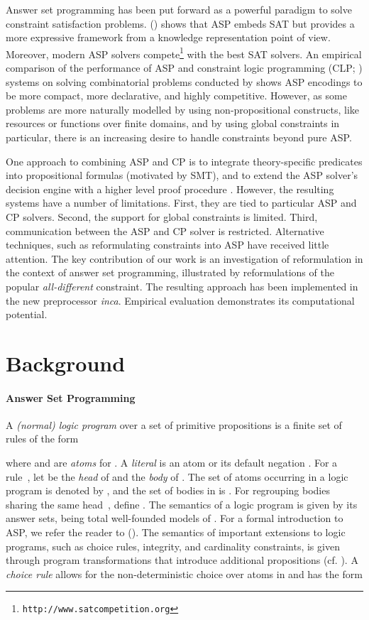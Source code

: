 \documentclass[letterpaper]{article}
\newcommand{\systemname}[1]{\textit{#1}}
\newcommand{\citeay}[1]{\citeauthor{#1} \citeyear{#1}}
\newcommand{\citeap}[1]{\citeauthor{#1} (\citeyear{#1})}
\begin{document}
Answer set programming has been put forward as a powerful paradigm to solve constraint  satisfaction problems. \citeap{niemela99a} shows that ASP embeds SAT but provides a more expressive framework from a knowledge representation point of view. Moreover, modern ASP solvers compete\footnote{\texttt{http://www.satcompetition.org}} with the best SAT solvers.
An empirical comparison of the performance of ASP and constraint logic programming (CLP; \citeay{jama94a}) systems on solving combinatorial problems conducted by \citeauthor{dofopo05a} shows ASP encodings to be more compact, more declarative, and highly competitive.
However, as some problems are more naturally modelled by using non-pro\-po\-si\-tional constructs, like resources or functions over finite domains, and by using global
constraints in particular, there is an increasing desire to handle constraints beyond pure ASP.

One approach to combining ASP and CP is to integrate theory-specific predicates into propositional formulas (motivated by SMT), and to extend the ASP solver's decision engine with a higher level proof procedure \cite{baboge05a,melgel08a,geossc09a}. However, the resulting systems have a number of limitations. First, they are tied to particular ASP and CP solvers. Second, the support for global constraints is limited. Third, communication between the ASP and CP solver is restricted.
Alternative techniques, such as reformulating constraints into ASP have received little attention.
The key contribution of our work is an investigation of reformulation in the context of answer set programming, illustrated by reformulations of the popular \emph{all-different} constraint. The resulting approach has been implemented in the new preprocessor \systemname{inca}. Empirical evaluation demonstrates its computational potential.



\section{Background}
\paragraph{Answer Set Programming}
A \emph{(normal) logic program}  over a set of primitive propositions  is a finite set of rules of the form

where  and  are \emph{atoms} for . A \emph{literal}  is an atom  or its default negation .
For a rule~, let  be the \emph{head} of  and  the \emph{body} of . The set of atoms occurring in a logic program  is denoted by , and the set of bodies in  is . For regrouping bodies sharing the same head~, define .
The semantics of a logic program is given by its answer sets, being total well-founded models of . For a formal introduction to ASP, we refer the reader to \citeap{baral03}.
The semantics of important extensions to logic programs, such as choice rules, integrity, and cardinality constraints, is given through program transformations that introduce additional propositions (cf. \citeay{siniso02a}).
A \emph{choice rule} allows for the non-deterministic choice over atoms in  and has the form
\end{document}
